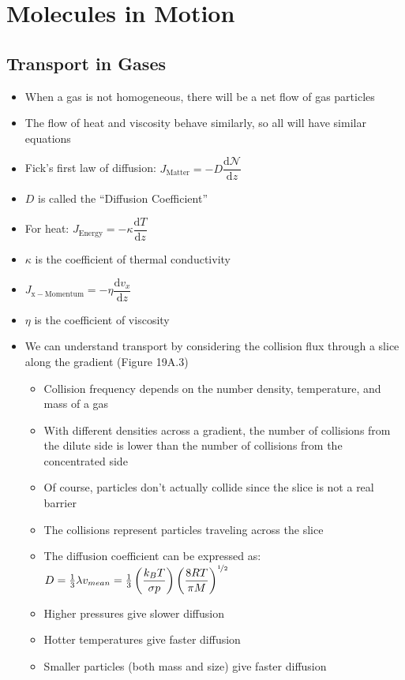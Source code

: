 \documentclass[12pt, openany, letterpaper]{memoir}
\begin{document}
\chapter{Molecules in Motion}
\section{Transport in Gases}
\begin{itemize}
	\item When a gas is not homogeneous, there will be a net flow of gas particles
	\item The flow of heat and viscosity behave similarly, so all will have similar equations
	\item Fick's first law of diffusion: $J_{\mathrm{Matter}}=-D\dfrac{\mathrm{d}\mathcal{N}}{\mathrm{d}z}$
	\item $D$ is called the “Diffusion Coefficient”
	\item For heat: $J_{\mathrm{Energy}} = -\kappa\dfrac{\mathrm{d}T}{\mathrm{d}z}$
	\item $\kappa$ is the coefficient of thermal conductivity
	\item $J_{\mathrm{x-Momentum}} = -\eta\dfrac{\mathrm{d}v_x}{\mathrm{d}z}$
	\item $\eta$ is the coefficient of viscosity
	\item We can understand transport by considering the collision flux through a slice along the gradient (Figure 19A.3)
	\begin{itemize}
		\item Collision frequency depends on the number density, temperature, and mass of a gas
		\item With different densities across a gradient, the number of collisions from the dilute side is lower than the number of collisions from the concentrated side
		\item Of course, particles don't actually collide since the slice is not a real barrier
		\item The collisions represent particles traveling across the slice
		\item The diffusion coefficient can be expressed as: $D=\frac{1}{3}\lambda v_{mean}=\frac{1}{3}\left(\dfrac{k_BT}{\sigma p}\right)\left(\dfrac{8RT}{\pi M}\right)^{\nicefrac{1}{2}}$
		\item Higher pressures give slower diffusion
		\item Hotter temperatures give faster diffusion
		\item Smaller particles (both mass and size) give faster diffusion

\end{itemize}
\end{itemize}
\end{document}
